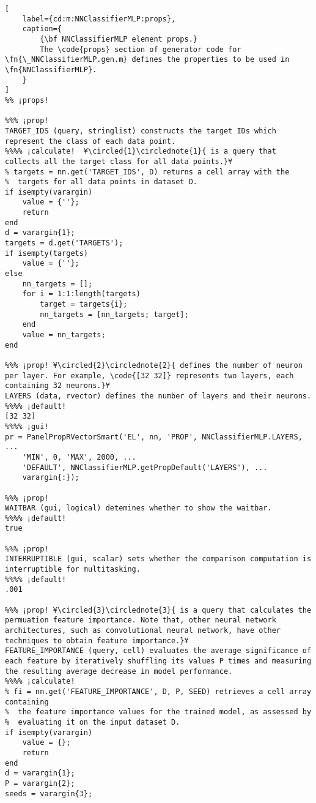 \documentclass{tufte-handout}
\begin{document}
\begin{lstlisting}[
	label={cd:m:NNClassifierMLP:props},
	caption={
		{\bf NNClassifierMLP element props.}
		The \code{props} section of generator code for \fn{\_NNClassifierMLP.gen.m} defines the properties to be used in \fn{NNClassifierMLP}.
	}
]
%% ¡props!

%%% ¡prop! 
TARGET_IDS (query, stringlist) constructs the target IDs which represent the class of each data point.
%%%% ¡calculate!  ¥\circled{1}\circlednote{1}{ is a query that collects all the target class for all data points.}¥
% targets = nn.get('TARGET_IDS', D) returns a cell array with the
%  targets for all data points in dataset D.
if isempty(varargin)
    value = {''};
    return
end
d = varargin{1};
targets = d.get('TARGETS');
if isempty(targets)
    value = {''};
else
    nn_targets = [];
    for i = 1:1:length(targets)
        target = targets{i};
        nn_targets = [nn_targets; target];
    end
    value = nn_targets;
end

%%% ¡prop! ¥\circled{2}\circlednote{2}{ defines the number of neuron per layer. For example, \code{[32 32]} represents two layers, each containing 32 neurons.}¥
LAYERS (data, rvector) defines the number of layers and their neurons.
%%%% ¡default!
[32 32]
%%%% ¡gui!
pr = PanelPropRVectorSmart('EL', nn, 'PROP', NNClassifierMLP.LAYERS, ...
    'MIN', 0, 'MAX', 2000, ...
    'DEFAULT', NNClassifierMLP.getPropDefault('LAYERS'), ...
    varargin{:});

%%% ¡prop!
WAITBAR (gui, logical) detemines whether to show the waitbar.
%%%% ¡default!
true

%%% ¡prop!
INTERRUPTIBLE (gui, scalar) sets whether the comparison computation is interruptible for multitasking.
%%%% ¡default!
.001

%%% ¡prop! ¥\circled{3}\circlednote{3}{ is a query that calculates the permuation feature importance. Note that, other neural network architectures, such as convolutional neural network, have other techniques to obtain feature importance.}¥
FEATURE_IMPORTANCE (query, cell) evaluates the average significance of each feature by iteratively shuffling its values P times and measuring the resulting average decrease in model performance.
%%%% ¡calculate!
% fi = nn.get('FEATURE_IMPORTANCE', D, P, SEED) retrieves a cell array containing
%  the feature importance values for the trained model, as assessed by
%  evaluating it on the input dataset D.
if isempty(varargin)
    value = {};
    return
end
d = varargin{1};
P = varargin{2};
seeds = varargin{3};


\end{lstlisting}
\end{document}
